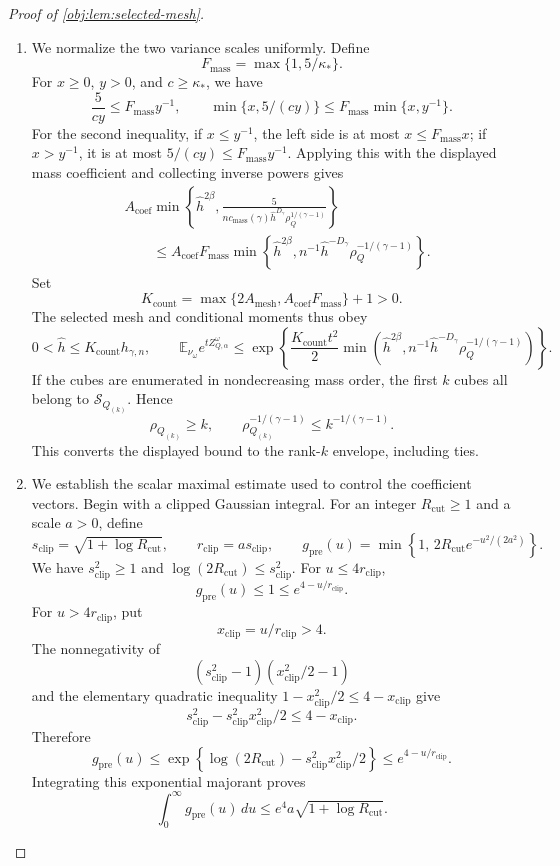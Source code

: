 \documentclass[11pt]{article}
\begin{document}
\begin{proof}[Proof of \cref{obj:lem:selected-mesh}]
\begin{enumerate}
\item We normalize the two variance scales uniformly. Define
\[
F_{\mathrm{mass}}=\max\{1,5/\kappa_*\}.
\]
For \(x\ge0\), \(y>0\), and \(c\ge\kappa_*\), we have
\[
\frac5{cy}\le F_{\mathrm{mass}}y^{-1},
\qquad
\min\{x,5/(cy)\}
\le F_{\mathrm{mass}}\min\{x,y^{-1}\}.
\]
For the second inequality, if \(x\le y^{-1}\), the left side is at most
\(x\le F_{\mathrm{mass}}x\); if \(x>y^{-1}\), it is at most
\(5/(cy)\le F_{\mathrm{mass}}y^{-1}\).
Applying this with the displayed mass coefficient and collecting
inverse powers gives
\[
\begin{aligned}
&A_{\mathrm{coef}}
\min\!\left\{
\widehat h^{2\beta},
\frac5{
n c_{\mathrm{mass}}(\gamma)\widehat h^{D_\gamma}
\rho_Q^{1/(\gamma-1)}}
\right\}\\
&\qquad\le
A_{\mathrm{coef}}F_{\mathrm{mass}}
\min\!\left\{
\widehat h^{2\beta},
n^{-1}\widehat h^{-D_\gamma}\rho_Q^{-1/(\gamma-1)}
\right\}.
\end{aligned}
\]
Set
\[
K_{\mathrm{count}}
=
\max\{2A_{\mathrm{mesh}},A_{\mathrm{coef}}F_{\mathrm{mass}}\}+1>0.
\]
The selected mesh and conditional moments thus obey
\[
0<\widehat h\le K_{\mathrm{count}}h_{\gamma,n},
\qquad
\mathbb E_{\nu_\omega}e^{tZ_{Q,\alpha}^\omega}
\le
\exp\!\left\{
\frac{K_{\mathrm{count}}t^2}{2}
\min\!\left(
\widehat h^{2\beta},
n^{-1}\widehat h^{-D_\gamma}\rho_Q^{-1/(\gamma-1)}
\right)
\right\}.
\]
If the cubes are enumerated in nondecreasing mass order, the first \(k\)
cubes all belong to \(\mathcal S_{Q_{(k)}}\). Hence
\[
\rho_{Q_{(k)}}\ge k,
\qquad
\rho_{Q_{(k)}}^{-1/(\gamma-1)}
\le k^{-1/(\gamma-1)}.
\]
This converts the displayed bound to the rank-\(k\) envelope, including
ties.

\item We establish the scalar maximal estimate used to control the
coefficient vectors. Begin with a clipped Gaussian integral. For an
integer \(R_{\mathrm{cut}}\ge1\) and a scale \(a>0\), define
\[
s_{\mathrm{clip}}=\sqrt{1+\log R_{\mathrm{cut}}},
\qquad
r_{\mathrm{clip}}=a s_{\mathrm{clip}},
\qquad
g_{\mathrm{pre}}(u)
=
\min\!\left\{1,\,
2R_{\mathrm{cut}}e^{-u^2/(2a^2)}\right\}.
\]
We have \(s_{\mathrm{clip}}^2\ge1\) and
\(\log(2R_{\mathrm{cut}})\le s_{\mathrm{clip}}^2\).
For \(u\le4r_{\mathrm{clip}}\),
\[
g_{\mathrm{pre}}(u)\le1\le e^{4-u/r_{\mathrm{clip}}}.
\]
For \(u>4r_{\mathrm{clip}}\), put
\[
x_{\mathrm{clip}}=u/r_{\mathrm{clip}}>4.
\]
The nonnegativity of
\[
(s_{\mathrm{clip}}^2-1)(x_{\mathrm{clip}}^2/2-1)
\]
and the elementary quadratic inequality
\(1-x_{\mathrm{clip}}^2/2\le4-x_{\mathrm{clip}}\) give
\[
s_{\mathrm{clip}}^2
-s_{\mathrm{clip}}^2x_{\mathrm{clip}}^2/2
\le4-x_{\mathrm{clip}}.
\]
Therefore
\[
g_{\mathrm{pre}}(u)
\le
\exp\!\left\{
\log(2R_{\mathrm{cut}})
-s_{\mathrm{clip}}^2x_{\mathrm{clip}}^2/2
\right\}
\le e^{4-u/r_{\mathrm{clip}}}.
\]
Integrating this exponential majorant proves
\[
\int_0^\infty g_{\mathrm{pre}}(u)\,du
\le e^4a\sqrt{1+\log R_{\mathrm{cut}}}.
\]


\end{enumerate}
\end{proof}
\end{document}

